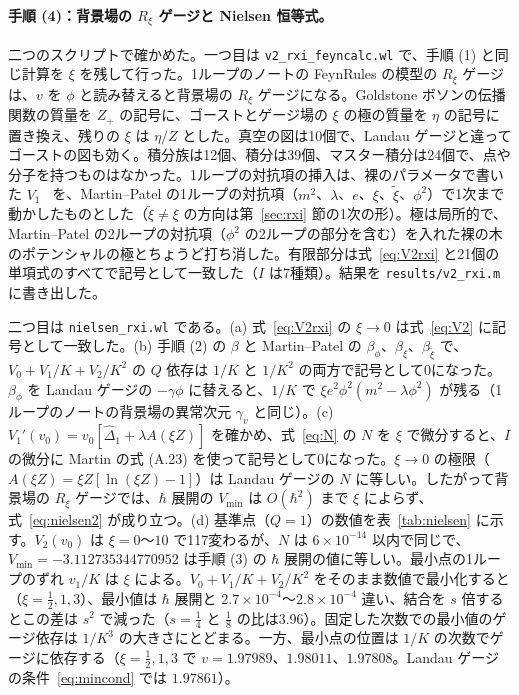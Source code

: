 \documentclass[a4paper,10pt]{ltjsarticle}
\begin{document}
\paragraph{手順 (4)：背景場の $R_\xi$ ゲージと Nielsen 恒等式。}二つのスクリプトで確かめた。一つ目は \texttt{v2\_rxi\_feyncalc.wl} で、手順 (1) と同じ計算を $\xi$ を残して行った。1ループのノートの FeynRules の模型の $R_\xi$ ゲージは、$v$ を $\phi$ と読み替えると背景場の $R_\xi$ ゲージになる。Goldstone ボソンの伝播関数の質量を $Z_+$ の記号に、ゴーストとゲージ場の $\xi$ の極の質量を $\eta$ の記号に置き換え、残りの $\xi$ は $\eta/Z$ とした。真空の図は10個で、Landau ゲージと違ってゴーストの図も効く。積分族は12個、積分は39個、マスター積分は24個で、点や分子を持つものはなかった。1ループの対抗項の挿入は、裸のパラメータで書いた $V_1$~\cite{mp18} を、Martin--Patel の1ループの対抗項（$m^2$、$\lambda$、$e$、$\xi$、$\tilde\xi$、$\phi^2$）で1次まで動かしたものとした（$\tilde\xi\ne\xi$ の方向は第~\ref{sec:rxi} 節の1次の形）。極は局所的で、Martin--Patel の2ループの対抗項（$\phi^2$ の2ループの部分を含む）を入れた裸の木のポテンシャルの極とちょうど打ち消した。有限部分は式~\eqref{eq:V2rxi} と21個の単項式のすべてで記号として一致した（$I$ は7種類）。結果を \texttt{results/v2\_rxi.m} に書き出した。

二つ目は \texttt{nielsen\_rxi.wl} である。(a) 式~\eqref{eq:V2rxi} の $\xi\to0$ は式~\eqref{eq:V2} に記号として一致した。(b) 手順 (2) の $\beta$ と Martin--Patel の $\beta_\phi$、$\beta_\xi$、$\beta_{\tilde\xi}$ で、$V_0+V_1/K+V_2/K^2$ の $Q$ 依存は $1/K$ と $1/K^2$ の両方で記号として0になった。$\beta_\phi$ を Landau ゲージの $-\gamma\phi$ に替えると、$1/K$ で $\xi e^2\phi^2(m^2-\lambda\phi^2)$ が残る（1ループのノートの背景場の異常次元 $\gamma_v$ と同じ）。(c) $V_1'(v_0)=v_0[\hat\Delta_1+\lambda A(\xi Z)]$ を確かめ、式~\eqref{eq:N} の $N$ を $\xi$ で微分すると、$I$ の微分に Martin の式 (A.23) を使って記号として0になった。$\xi\to0$ の極限（$A(\xi Z)=\xi Z[\ln(\xi Z)-1]$）は Landau ゲージの $N$ に等しい。したがって背景場の $R_\xi$ ゲージでは、$\hbar$ 展開の $V_{\min}$ は $O(\hbar^2)$ まで $\xi$ によらず、式~\eqref{eq:nielsen2} が成り立つ。(d) 基準点（$Q=1$）の数値を表~\ref{tab:nielsen} に示す。$V_2(v_0)$ は $\xi=0$〜$10$ で117変わるが、$N$ は $6\times10^{-14}$ 以内で同じで、$V_{\min}=-3.112735344770952$ は手順 (3) の $\hbar$ 展開の値に等しい。最小点の1ループのずれ $v_1/K$ は $\xi$ による。$V_0+V_1/K+V_2/K^2$ をそのまま数値で最小化すると（$\xi=\frac12,1,3$）、最小値は $\hbar$ 展開と $2.7\times10^{-4}$〜$2.8\times10^{-4}$ 違い、結合を $s$ 倍するとこの差は $s^2$ で減った（$s=\frac14$ と $\frac18$ の比は3.96）。固定した次数での最小値のゲージ依存は $1/K^3$ の大きさにとどまる。一方、最小点の位置は $1/K$ の次数でゲージに依存する（$\xi=\frac12,1,3$ で $v=1.97989$、$1.98011$、$1.97808$。Landau ゲージの条件~\eqref{eq:mincond} では $1.97861$）。
\end{document}
